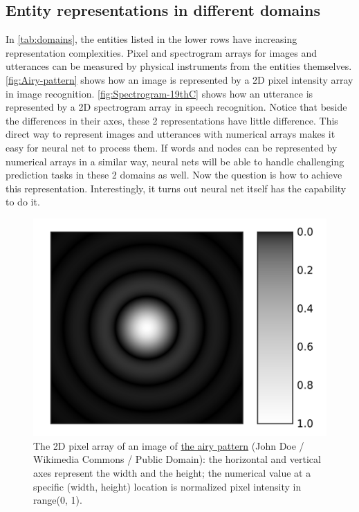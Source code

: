 \documentclass{article}
\begin{document}
\subsection{Entity representations in different domains}
In \autoref{tab:domains}, the entities listed in the lower rows have increasing representation complexities. Pixel and spectrogram arrays for images and utterances can be measured by physical instruments from the entities themselves. \autoref{fig:Airy-pattern} shows how an image is represented by a 2D pixel intensity array in image recognition. \autoref{fig:Spectrogram-19thC} shows how an utterance is represented by a 2D spectrogram array in speech recognition. Notice that beside the differences in their axes, these 2 representations have little difference. This direct way to represent images and utterances with numerical arrays makes it easy for neural net to process them. If words and nodes can be represented by numerical arrays in a similar way, neural nets will be able to handle challenging prediction tasks in these 2 domains as well. Now the question is how to achieve this representation. Interestingly, it turns out neural net itself has the capability to do it.
\begin{figure}[h]
	\centering
	\includegraphics[width=0.5\linewidth]{Airy-pattern}
	\caption{The 2D pixel array of an image of  \href{https://commons.wikimedia.org/wiki/File:Airy-pattern.svg}{the airy pattern} (John Doe / Wikimedia Commons / Public Domain): the horizontal and vertical axes represent the width and the height; the numerical value at a specific (width, height) location is normalized pixel intensity in range(0, 1).}
	\label{fig:Airy-pattern}
\end{figure}
\end{document}
